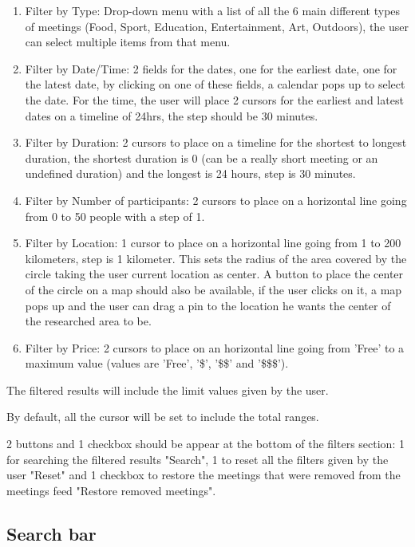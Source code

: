 \documentclass[conference]{IEEEtran}
\begin{document}
\begin{enumerate}
    \item Filter by Type: Drop-down menu with a list of all the 6 main different types of meetings (Food, Sport, Education, Entertainment, Art, Outdoors), the user can select multiple items from that menu.
    \item Filter by Date/Time: 2 fields for the dates, one for the earliest date, one for the latest date, by clicking on one of these fields, a calendar pops up to select the date.
    For the time, the user will place 2 cursors for the earliest and latest dates on a timeline of 24hrs, the step should be 30 minutes.
    \item Filter by Duration: 2 cursors to place on a timeline for the shortest to longest duration, the shortest duration is 0 (can be a really short meeting or an undefined duration) and the longest is 24 hours, step is 30 minutes.
    \item Filter by Number of participants: 2 cursors to place on a horizontal line going from 0 to 50 people with a step of 1.
    \item Filter by Location: 1 cursor to place on a horizontal line going from 1 to 200 kilometers, step is 1 kilometer.
    This sets the radius of the area covered by the circle taking the user current location as center.
    A button to place the center of the circle on a map should also be available, if the user clicks on it, a map pops up and the user can drag a pin to the location he wants the center of the researched area to be.
    \item Filter by Price: 2 cursors to place on an horizontal line going from 'Free' to a maximum value (values are 'Free', '\$', '\$\$' and '\$\$\$').
\end{enumerate}

The filtered results will include the limit values given by the user.

By default, all the cursor will be set to include the total ranges.

2 buttons and 1 checkbox should be appear at the bottom of the filters section: 1 for searching the filtered results "Search", 1 to reset all the filters given by the user "Reset" and 1 checkbox to restore the meetings that were removed from the meetings feed "Restore removed meetings".

\subsection{Search bar}
\end{document}
